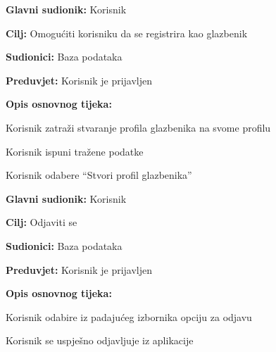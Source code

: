 			\noindent {}
			\begin{packed_item}
				
				\item \textbf{Glavni sudionik: } Korisnik
				\item  \textbf{Cilj:} Omogućiti korisniku da se registrira kao glazbenik 
				\item  \textbf{Sudionici:} Baza podataka
				\item  \textbf{Preduvjet:} Korisnik je prijavljen
				\item  \textbf{Opis osnovnog tijeka:} 
				
				\item[] \begin{packed_enum}
					
					\item Korisnik zatraži stvaranje profila glazbenika na svome profilu
					\item Korisnik ispuni tražene podatke
					\item Korisnik odabere “Stvori profil glazbenika”
			
				\end{packed_enum}
			\end{packed_item}	
		
		   \noindent \underbar{\textbf{UC19 - Odjava}}
		   \begin{packed_item}
		   	
		   	\item \textbf{Glavni sudionik: } Korisnik
		   	\item  \textbf{Cilj:} Odjaviti se
		   	\item  \textbf{Sudionici:} Baza podataka
		   	\item  \textbf{Preduvjet:} Korisnik je prijavljen
		   	\item  \textbf{Opis osnovnog tijeka:} 
		   	
		   	\item[] \begin{packed_enum}
		   		
		   		\item Korisnik odabire iz padajućeg izbornika opciju za odjavu
		   		\item Korisnik se uspješno odjavljuje iz aplikacije
		   		
		   	\end{packed_enum}
		   \end{packed_item}	 
	
